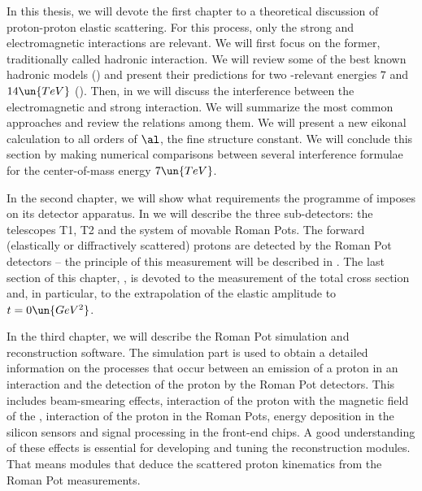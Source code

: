 


In this thesis, we will devote the first chapter to a theoretical discussion of proton-proton elastic scattering. For this process, only the strong and electromagnetic interactions are relevant. We will first focus on the former, traditionally called hadronic interaction. We will review some of the best known hadronic models () and present their predictions for two -relevant energies $7$ and $14\un{TeV}$ (). Then, in  we will discuss the interference between the electromagnetic and strong interaction. We will summarize the most common approaches and review the relations among them. We will present a new eikonal calculation to all orders of $\al$, the fine structure constant. We will conclude this section by making numerical comparisons between several interference formulae for the center-of-mass energy $7\un{TeV}$.

In the second chapter, we will show what requirements the programme of  imposes on its detector apparatus. In  we will describe the three sub-detectors: the telescopes T1, T2 and the system of movable Roman Pots. The forward (elastically or diffractively scattered) protons are detected by the Roman Pot detectors -- the principle of this measurement will be described in . The last section of this chapter, , is devoted to the measurement of the total cross section and, in particular, to the extrapolation of the elastic amplitude to $t=0\un{GeV^2}$.

In the third chapter, we will describe the Roman Pot simulation and reconstruction software. The simulation part is used to obtain a detailed information on the processes that occur between an emission of a proton in an interaction and the detection of the proton by the Roman Pot detectors. This includes beam-smearing effects, interaction of the proton with the magnetic field of the , interaction of the proton in the Roman Pots, energy deposition in the silicon sensors and signal processing in the front-end chips. A good understanding of these effects is essential for developing and tuning the reconstruction modules. That means modules that deduce the scattered proton kinematics from the Roman Pot measurements.

